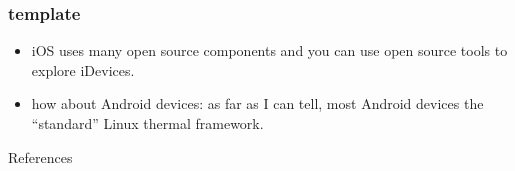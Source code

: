 \documentclass{beamer}
\begin{document}
\begin{frame}
  \frametitle{template}
  \begin{itemize}
  \item iOS uses many open source components and you can use open source tools to explore iDevices.
  \item how about Android devices: as far as I can tell, most Android devices the ``standard'' Linux thermal framework.
  \end{itemize}
\end{frame}

\begin{frame}[allowframebreaks]
  \begin{block}{References}
    \tiny
    
    
  \end{block} 
\end{frame}
\end{document}
